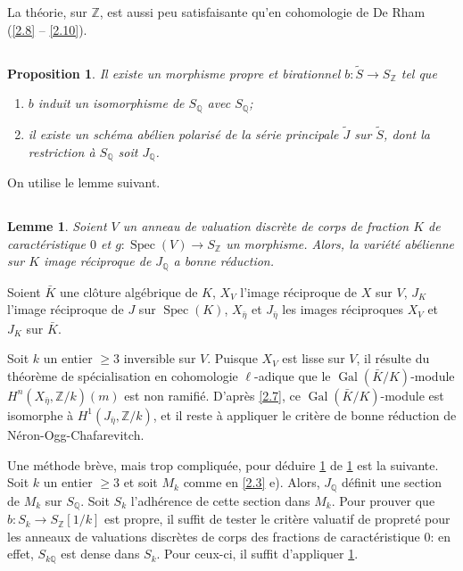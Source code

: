 \documentclass[10pt,leqno]{amsart}
\theoremstyle{plain}
\newtheorem{lemma}[theorem]{Lemme}
\newtheorem{proposition}[theorem]{Proposition}
\theoremstyle{definition}
\theoremstyle{remark}
\DeclareMathOperator{\Spec}{Spec}
\DeclareMathOperator{\Gal}{Gal}
\newcommand{\ZZ}{\mathbb{Z}}
\newcommand{\QQ}{\mathbb{Q}}
\begin{document}
La th\'eorie, sur $\ZZ$, est aussi peu satisfaisante qu'en cohomologie de De Rham (\ref{2.8} -- \ref{2.10}).

\subsection{}\label{3.1}

\begin{proposition}\label{prop:3.1}
Il existe un morphisme propre et birationnel $b\colon\tilde{S}\to S_\ZZ$ tel que
\begin{enumerate}
\item[a)] $b$ induit un isomorphisme de $S_\QQ$ avec $S_\QQ$;
\item[b)] il existe un sch\'ema ab\'elien polaris\'e de la s\'erie principale $\tilde{J}$ sur $\tilde{S}$, dont la restriction \`a $S_\QQ$ soit $J_\QQ$.
\end{enumerate}
\end{proposition}

On utilise le lemme suivant.

\subsection{}\label{3.2}

\begin{lemma}\label{lem:3.2}
Soient $V$ un anneau de valuation discr\`ete de corps de fraction $K$ de caract\'eristique $0$ et $g\colon\Spec(V)\to S_\ZZ$ un morphisme. Alors, la vari\'et\'e ab\'elienne sur $K$ image r\'eciproque de $J_\QQ$ a bonne r\'eduction.
\end{lemma}

Soient $\bar{K}$ une cl\^oture alg\'ebrique de $K$, $X_V$ l'image r\'eciproque de $X$ sur $V$, $J_K$ l'image r\'eciproque de $J$ sur $\Spec(K)$, $X_{\bar{\eta}}$ et $J_{\bar{\eta}}$ les images r\'eciproques $X_V$ et $J_K$ sur $\bar{K}$.

Soit $k$ un entier $\ge 3$ inversible sur $V$. Puisque $X_V$ est lisse sur $V$, il r\'esulte du th\'eor\`eme de sp\'ecialisation en cohomologie $\ell$-adique que le $\Gal(\bar{K}/K)$-module $H^n(X_{\bar{\eta}},\ZZ/k)(m)$ est non ramifi\'e. D'apr\`es \ref{2.7}, ce $\Gal(\bar{K}/K)$-module est isomorphe \`a $H^1(J_{\bar{\eta}},\ZZ/k)$, et il reste \`a appliquer le crit\`ere de bonne r\'eduction de N\'eron-Ogg-Chafarevitch.

Une m\'ethode br\`eve, mais trop compliqu\'ee, pour d\'eduire \ref{prop:3.1} de \ref{lem:3.2} est la suivante. Soit $k$ un entier $\ge 3$ et soit $M_k$ comme en \ref{2.3} e). Alors, $J_\QQ$ d\'efinit une section de $M_k$ sur $S_\QQ$. Soit $S_k$ l'adh\'erence de cette section dans $M_k$. Pour prouver que $b\colon S_k\to S_\ZZ[1/k]$ est propre, il suffit de tester le crit\`ere valuatif de propret\'e pour les anneaux de valuations discr\`etes de corps des fractions de caract\'eristique $0$: en effet, $S_{k\QQ}$ est dense dans $S_k$. Pour ceux-ci, il suffit d'appliquer \ref{lem:3.2}.
\end{document}
